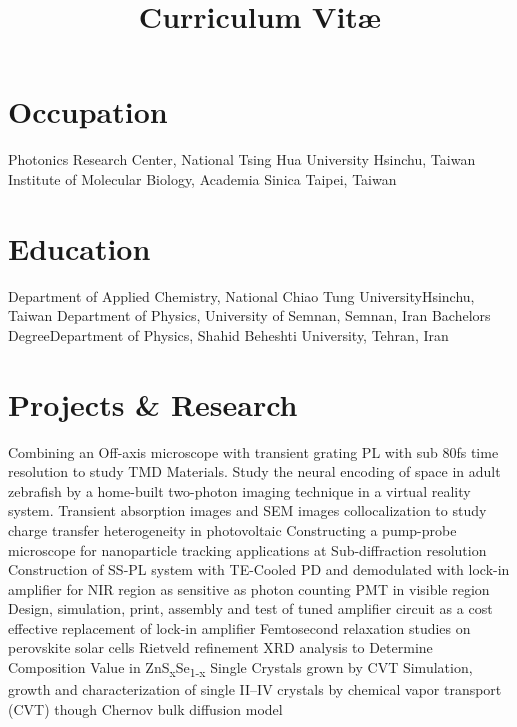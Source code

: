 \documentclass[11pt,a4paper]{moderncv}
\title{Curriculum Vit\ae}
\begin{document}
\makecvtitle
\vspace{-1.5cm}
\section{Occupation}
		{Photonics Research Center, National Tsing Hua University}
		{Hsinchu, Taiwan}{}{}
		{Institute of Molecular Biology, Academia Sinica}
		{Taipei, Taiwan}{}{}
\section{Education}
		{Department of Applied Chemistry, National Chiao
		Tung University}{Hsinchu, Taiwan}{}{}
		{Department of Physics, University of Semnan, Semnan, Iran}{}{}{}
		{Bachelors Degree}{Department of Physics, Shahid 
		Beheshti University, Tehran, Iran}{}{}{}
\section{Projects \& Research}

		{Combining an Off-axis microscope with 
		transient grating PL with sub 80fs time resolution 
		to study TMD Materials.}
		{Study the neural encoding of space in adult zebrafish 
		by a home-built two-photon 
		imaging technique in a virtual reality system.}
		{Transient absorption images and SEM images collocalization 
		to study charge transfer heterogeneity in photovoltaic}
		{Constructing a pump-probe microscope for nanoparticle tracking 
		applications at Sub-diffraction resolution}
		{Construction of SS-PL system with TE-Cooled PD 
		and demodulated with lock-in amplifier for NIR region as 
		sensitive as photon counting PMT in visible region}
		{Design, simulation, print, assembly and test 
		of tuned amplifier circuit as a cost effective replacement 
		of lock-in amplifier}
		{Femtosecond relaxation studies on perovskite solar cells}
		{Rietveld refinement XRD analysis to 
		Determine Composition Value in ZnS\textsubscript{x}Se\textsubscript{1-x} 
		Single Crystals grown by CVT}
		{Simulation, growth and characterization 
		of single II--IV crystals 
		by chemical vapor transport (CVT) though Chernov bulk diffusion model}
\end{document}
